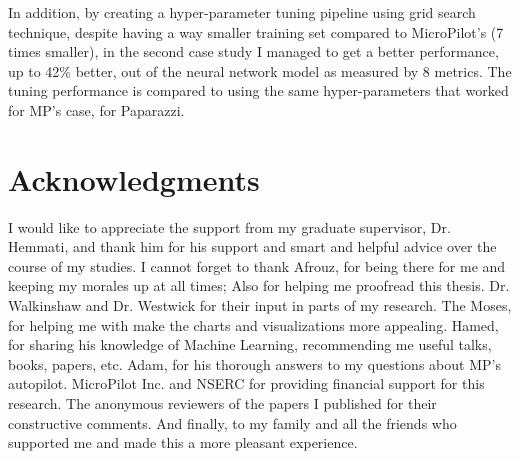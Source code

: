In addition, by creating a hyper-parameter tuning pipeline using grid search technique, despite having a way smaller training set compared to MicroPilot's (7 times smaller), in the second case study I managed to get a better performance, up to 42\% better, out of the neural network model as measured by 8 metrics.
The tuning performance is compared to using the same hyper-parameters that worked for MP's case, for Paparazzi.%




\chapter{Acknowledgments}
I would like to appreciate the support from my graduate supervisor, Dr. Hemmati, and thank him for his support and smart and helpful advice over the course of my studies.
I cannot forget to thank Afrouz, for being there for me and keeping my morales up at all times; Also for helping me proofread this thesis.
Dr. Walkinshaw and Dr. Westwick for their input in parts of my research.
The Moses, for helping me with make the charts and visualizations more appealing.
Hamed, for sharing his knowledge of Machine Learning, recommending me useful talks, books, papers, etc.
Adam, for his thorough answers to my questions about MP's autopilot.
MicroPilot Inc. and NSERC for providing financial support for this research.
The anonymous reviewers of the papers I published for their constructive comments.
And finally, to my family and all the friends who supported me and made this  a more pleasant experience.


